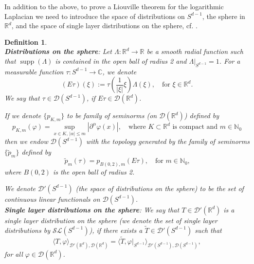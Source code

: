 \documentclass[11pt]{amsart}
\DeclareMathOperator{\supp}{supp}
\newcommand{\R}{\mathbb{R}}
\newcommand{\N}{\mathbb{N}}
\newtheorem{definition}{Definition}
\begin{document}
In addition to the above, to prove a Liouville theorem for the logarithmic Laplacian we need to introduce the space of distributions on $S^{d-1}$, the sphere in $\R^d$, and the space of single layer distributions on the sphere, cf. \cite[Chapter 6]{MR2000535}.  


\begin{definition}\label{def:distri_sphere}\ \\
\textbf{Distributions on the sphere}: Let $\Lambda:\mathbb{R}^d\rightarrow\R$ be a smooth radial function such that $\supp(\Lambda)$ is contained in the open ball of radius 2 and $\Lambda|_{S^{d-1}}=1$. 
	For a measurable function $\tau:S^{d-1}\rightarrow \mathbb{C}$, we denote 
	\begin{equation*}
		(E\tau)(\xi):=\tau\left (\frac{1}{|\xi|}\xi\right )\Lambda(\xi), \quad \text{for $\xi\in \R^d$}. 
	\end{equation*}
	We say that $\tau \in \mathcal{D}(S^{d-1})$, if $E\tau\in \mathcal{D}(\R^d)$. 
	
	If we denote $\{p_{K,m}\}$ to be family of seminorms (on $\mathcal{D}(\R^d)$) defined by 
	\begin{equation*}
			p_{K,m}(\varphi) = \sup_{x \in K,\, |\alpha| \leq m} |\partial^\alpha \varphi(x)|,\quad \text{where $K \subset \R^d$ is compact and $m \in \mathbb{N}_0$}
	\end{equation*}
	then we endow $\mathcal{D}(S^{d-1})$ with the topology generated by the family of seminorms $\{\tilde{p}_{m}\}$ defined by 
	\begin{equation*}
			\tilde{p}_{m}(\tau) = p_{B(0,2),m}(E\tau),\quad \text{for $m\in \N_0$,}
	\end{equation*}
  where $B(0,2)$ is the open ball of radius 2. 
	
	We denote $\mathcal{D}'(S^{d-1})$ (the space of distributions on the sphere) to be the set of continuous linear functionals on $\mathcal{D}(S^{d-1})$.
	\ \\
\textbf{Single layer distributions on the sphere}: We say that $T\in \mathcal{D}'(\R^d)$ is a single layer distribution on the sphere (we denote the set of single layer distributions by $\mathcal{SL}(S^{d-1})$), if there exists a $\tilde{T}\in \mathcal{D}'(S^{d-1})$ such that 
	\begin{equation*}
		\langle T,\varphi\rangle_{\mathcal{D}'(\R^d),\mathcal{D}(\R^d)}=		\langle \tilde{T},\varphi|_{S^{d-1}}\rangle_{\mathcal{D}'(S^{d-1}),\mathcal{D}(S^{d-1})},
	\end{equation*}
	for all $\varphi \in \mathcal{D}(\R^d)$. 
\end{definition}
\end{document}
